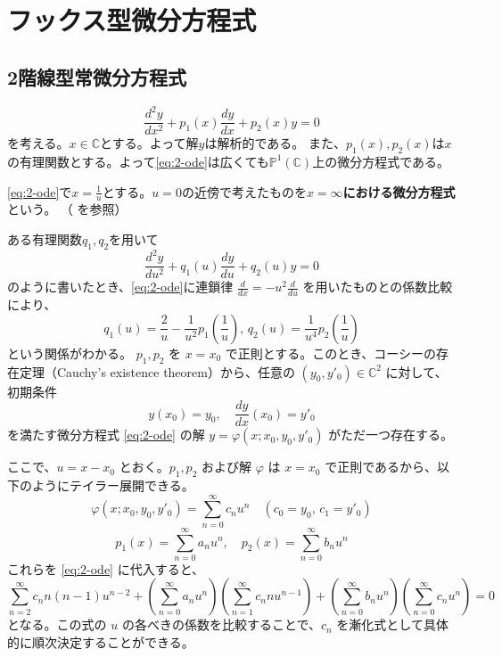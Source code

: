 
\section{フックス型微分方程式}

\subsection{2階線型常微分方程式}
\begin{equation}\label{eq:2-ode}
\frac{d^{2}y}{dx^{2}} + p_{1}(x)\frac{dy}{dx} + p_{2}(x)y = 0   
\end{equation}
を考える。$x\in\mathbb{C}$とする。よって解$y$は解析的である。
また、$p_{1}(x),p_{2}(x)$は$x$の有理関数とする。よって\eqref{eq:2-ode}は広くても$\mathbb{P}^{1}(\mathbb{C})$上の微分方程式である。
\begin{definition}[$x=\infty$における微分方程式]
    \eqref{eq:2-ode}で$x=\frac{1}{u}$とする。$u=0$の近傍で考えたものを\textbf{$x=\infty$における微分方程式}という。
    （\cite[p.49]{book:okamoto} を参照）
\end{definition}
ある有理関数$q_{1},q_{2}$を用いて
\[
\frac{d^{2}y}{du^{2}} + q_{1}(u)\frac{dy}{du} + q_{2}(u)y = 0
\]
のように書いたとき、\eqref{eq:2-ode}に連鎖律 $\frac{d}{dx} = -u^2 \frac{d}{du}$ を用いたものとの係数比較により、
\[
q_{1}(u) = \frac{2}{u}-\frac{1}{u^{2}}p_{1}\left(\frac{1}{u}\right),\, q_2(u)=\frac{1}{u^{4}}p_{2}\left(\frac{1}{u}\right)
\]
という関係がわかる。
$p_{1}, p_{2}$ を $x=x_{0}$ で正則とする。このとき、コーシーの存在定理（Cauchy's existence theorem）から、任意の $(y_{0}, y'_{0}) \in \mathbb{C}^{2}$ に対して、初期条件
$$
y(x_{0}) = y_{0}, \quad \frac{dy}{dx}(x_{0}) = y'_{0}
$$
を満たす微分方程式 \eqref{eq:2-ode} の解 $y = \varphi(x; x_{0}, y_{0}, y'_{0})$ がただ一つ存在する。

ここで、$u = x - x_{0}$ とおく。$p_1, p_2$ および解 $\varphi$ は $x=x_0$ で正則であるから、以下のようにテイラー展開できる。
$$
\varphi(x; x_{0}, y_{0}, y'_{0}) = \sum_{n=0}^{\infty} c_{n} u^{n} \quad (c_{0} = y_{0}, \, c_{1} = y'_{0})
$$
$$
p_{1}(x) = \sum_{n=0}^{\infty} a_{n} u^{n}, \quad p_{2}(x) = \sum_{n=0}^{\infty} b_{n} u^{n}
$$
これらを \eqref{eq:2-ode} に代入すると、
$$
\sum_{n=2}^{\infty} c_{n} n(n-1) u^{n-2} + \left( \sum_{n=0}^{\infty} a_{n} u^{n} \right) \left( \sum_{n=1}^{\infty} c_{n} n u^{n-1} \right) + \left( \sum_{n=0}^{\infty} b_{n} u^{n} \right) \left( \sum_{n=0}^{\infty} c_{n} u^{n} \right) = 0
$$
となる。この式の $u$ の各べきの係数を比較することで、$c_n$ を漸化式として具体的に順次決定することができる。

